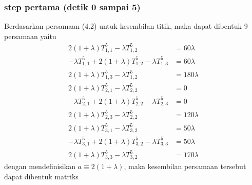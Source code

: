 \documentclass[a4paper,12pt]{article}
\numberwithin{equation}{section} %
\begin{document}
\subsubsection{step pertama (detik 0 sampai 5)}
Berdasarkan persamaan (4.2) untuk kesembilan titik, maka dapat dibentuk 9 persamaan yaitu
\begin{align*}
2(1+\lambda)T_{1,1}^5 - \lambda T_{1,2}^5 &= 60 \lambda \tag{i=1; j=1}\\
-\lambda T_{1,1}^5 + 2(1+\lambda)T_{1,2}^5 - \lambda T_{1,3}^5 &= 60 \lambda \tag{i=1; j=2}\\ 
2(1+\lambda)T_{1,3}^5 - \lambda T_{1,2}^5 &= 180 \lambda \tag{i=1; j=3}\\ 
2(1+\lambda)T_{2,1}^5 - \lambda T_{2,2}^5 &= 0 \tag{i=2; j=1}\\ 
-\lambda T_{2,1}^5 + 2(1+\lambda)T_{2,2}^5 - \lambda T_{2,3}^5 &= 0 \tag{i=2; j=2}\\ 
2(1+\lambda)T_{2,3}^5 - \lambda T_{2,2}^5 &= 120 \lambda \tag{i=2; j=3}\\ 
2(1+\lambda)T_{3,1}^5 - \lambda T_{3,2}^5 &= 50 \lambda \tag{i=3; j=1}\\ 
-\lambda T_{3,1}^5 + 2(1+\lambda)T_{3,2}^5 - \lambda T_{3,3}^5 &= 50 \lambda \tag{i=3; j=2}\\ 
2(1+\lambda)T_{3,3}^5 - \lambda T_{3,2}^5 &= 170 \lambda \tag{i=3; j=3}
\end{align*}
dengan mendefinisikan $a \equiv 2(1+\lambda)$, maka kesembilan persamaan tersebut dapat dibentuk matriks
\end{document}
